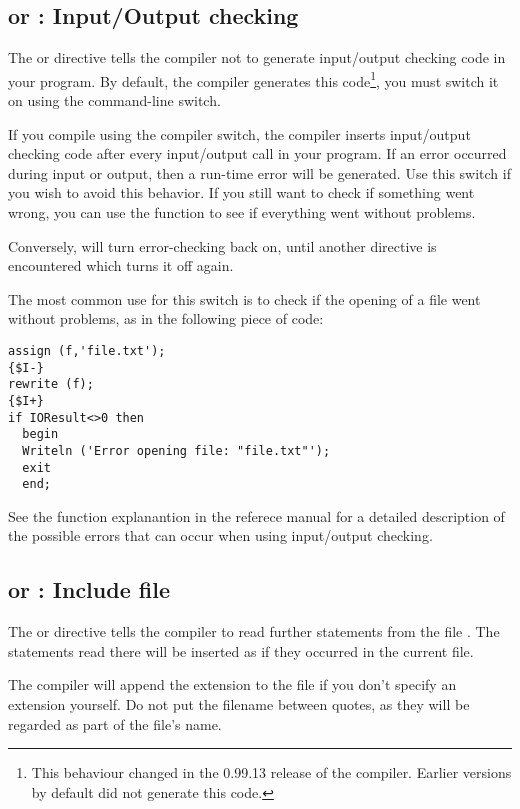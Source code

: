 \subsection{ or  : Input/Output checking}

The  or  directive tells the compiler
not to generate input/output checking code in your program. By default, the
compiler generates this code\footnote{This behaviour changed in the 0.99.13
release of the compiler. Earlier versions by default did not generate this
code.}, you must switch it on using the  command-line switch.

If you compile using the  compiler switch, the \fpc compiler inserts
input/output checking code after every input/output call in your program.
If an error occurred during input or output, then a run-time error will
be generated. Use this switch if you wish to avoid this behavior.
If you still want to check if something went wrong, you can use the
 function to see if everything went without problems.

Conversely,  will turn error-checking back on, until another
directive is encountered which turns it off again.

The most common use for this switch is to check if the opening of a file
went without problems, as in the following piece of code:
\begin{verbatim}
assign (f,'file.txt');
{$I-}
rewrite (f);
{$I+}
if IOResult<>0 then
  begin
  Writeln ('Error opening file: "file.txt"');
  exit
  end;
\end{verbatim}
See the  function explanantion in the referece manual for a
detailed description of the possible errors that can occur when using
input/output checking.

\subsection{ or  : Include file }

The  or  directive
tells the compiler to read further statements from the file .
The statements read there will be inserted as if they occurred in the
current file.

The compiler will append the  extension to the file if you don't
specify an extension yourself. Do not put the filename between quotes, as
they will be regarded as part of the file's name.

